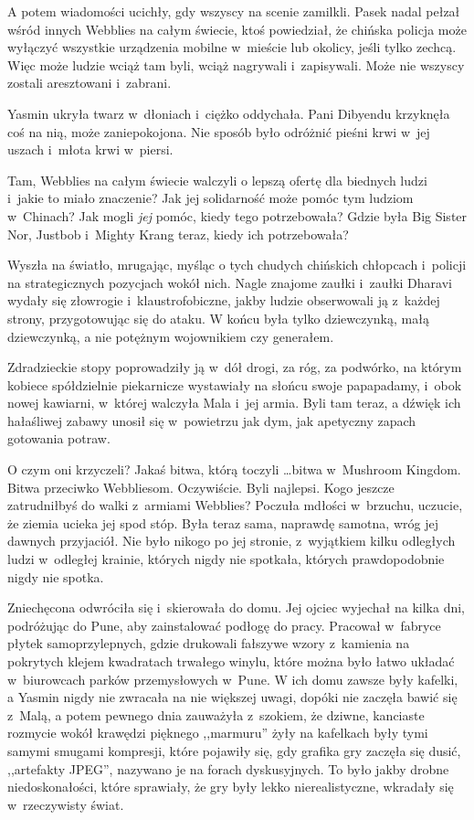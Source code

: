 \documentclass[oneside,polish,11pt,rmheadings]{mwbk}
\begin{document}
A potem wiadomości ucichły, gdy wszyscy na scenie zamilkli. Pasek nadal pełzał wśród innych Webblies na całym świecie, ktoś powiedział, że chińska policja może wyłączyć wszystkie urządzenia mobilne w~mieście lub okolicy, jeśli tylko zechcą. Więc może ludzie wciąż tam byli, wciąż nagrywali i~zapisywali. Może nie wszyscy zostali aresztowani i~zabrani.

Yasmin ukryła twarz w~dłoniach i~ciężko oddychała. Pani Dibyendu krzyknęła coś na nią, może zaniepokojona. Nie sposób było odróżnić pieśni krwi w~jej uszach i~młota krwi w~piersi.

Tam, Webblies na całym świecie walczyli o lepszą ofertę dla biednych ludzi i~jakie to miało znaczenie? Jak jej solidarność może pomóc tym ludziom w~Chinach? Jak mogli \textit{jej }pomóc, kiedy tego potrzebowała? Gdzie była Big Sister Nor, Justbob i~Mighty Krang teraz, kiedy ich potrzebowała?

Wyszła na światło, mrugając, myśląc o tych chudych chińskich chłopcach i~policji na strategicznych pozycjach wokół nich. Nagle znajome zaułki i~zaułki Dharavi wydały się złowrogie i~klaustrofobiczne, jakby ludzie obserwowali ją z~każdej strony, przygotowując się do ataku. W końcu była tylko dziewczynką, małą dziewczynką, a nie potężnym wojownikiem czy generałem.

Zdradzieckie stopy poprowadziły ją w~dół drogi, za róg, za podwórko, na którym kobiece spółdzielnie piekarnicze wystawiały na słońcu swoje papapadamy, i~obok nowej kawiarni, w~której walczyła Mala i~jej armia. Byli tam teraz, a dźwięk ich hałaśliwej zabawy unosił się w~powietrzu jak dym, jak apetyczny zapach gotowania potraw.

O czym oni krzyczeli? Jakaś bitwa, którą toczyli  \ldots  bitwa w~Mushroom Kingdom. Bitwa przeciwko Webbliesom. Oczywiście. Byli najlepsi. Kogo jeszcze zatrudniłbyś do walki z~armiami Webblies? Poczuła mdłości w~brzuchu, uczucie, że ziemia ucieka jej spod stóp. Była teraz sama, naprawdę samotna, wróg jej dawnych przyjaciół. Nie było nikogo po jej stronie, z~wyjątkiem kilku odległych ludzi w~odległej krainie, których nigdy nie spotkała, których prawdopodobnie nigdy nie spotka.

Zniechęcona odwróciła się i~skierowała do domu. Jej ojciec wyjechał na kilka dni, podróżując do Pune, aby zainstalować podłogę do pracy. Pracował w~fabryce płytek samoprzylepnych, gdzie drukowali fałszywe wzory z~kamienia na pokrytych klejem kwadratach trwałego winylu, które można było łatwo układać w~biurowcach parków przemysłowych w~Pune. W ich domu zawsze były kafelki, a Yasmin nigdy nie zwracała na nie większej uwagi, dopóki nie zaczęła bawić się z~Malą, a potem pewnego dnia zauważyła z~szokiem, że dziwne, kanciaste rozmycie wokół krawędzi pięknego ,,marmuru'' żyły na kafelkach były tymi samymi smugami kompresji, które pojawiły się, gdy grafika gry zaczęła się dusić, ,,artefakty JPEG'', nazywano je na forach dyskusyjnych. To było jakby drobne niedoskonałości, które sprawiały, że gry były lekko nierealistyczne, wkradały się w~rzeczywisty świat.
\end{document}
